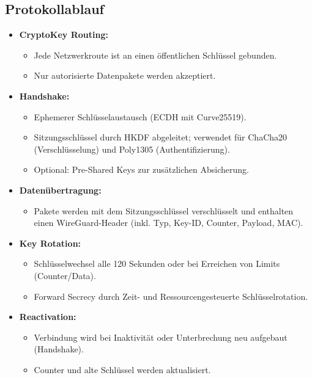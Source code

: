 \subsection{Protokollablauf}
\begin{itemize}
    \item \textbf{CryptoKey Routing:}
    \begin{itemize}
        \item Jede Netzwerkroute ist an einen öffentlichen Schlüssel gebunden.
        \item Nur autorisierte Datenpakete werden akzeptiert.
    \end{itemize}
    \item \textbf{Handshake:}
    \begin{itemize}
        \item Ephemerer Schlüsselaustausch (ECDH mit Curve25519).
        \item Sitzungsschlüssel durch HKDF abgeleitet; verwendet für ChaCha20 (Verschlüsselung) und Poly1305 (Authentifizierung).
        \item Optional: Pre-Shared Keys zur zusätzlichen Absicherung.
    \end{itemize}
    \item \textbf{Datenübertragung:}
    \begin{itemize}
        \item Pakete werden mit dem Sitzungsschlüssel verschlüsselt und enthalten einen WireGuard-Header (inkl. Typ, Key-ID, Counter, Payload, MAC).
    \end{itemize}
    \item \textbf{Key Rotation:}
    \begin{itemize}
        \item Schlüsselwechsel alle 120 Sekunden oder bei Erreichen von Limits (Counter/Data).
        \item Forward Secrecy durch Zeit- und Ressourcengesteuerte Schlüsselrotation.
    \end{itemize}
    \item \textbf{Reactivation:}
    \begin{itemize}
        \item Verbindung wird bei Inaktivität oder Unterbrechung neu aufgebaut (Handshake).
        \item Counter und alte Schlüssel werden aktualisiert.
    \end{itemize}
\end{itemize}

